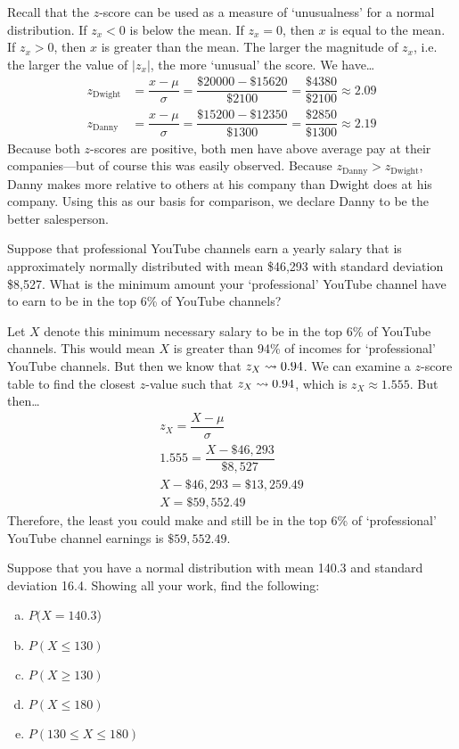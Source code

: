 \documentclass[12pt,letterpaper]{exam}
\begin{document}
\begin{questions}
\sol Recall that the $z$-score can be used as a measure of `unusualness' for a normal distribution. If $z_x < 0$ is below the mean. If $z_x = 0$, then $x$ is equal to the mean. If $z_x > 0$, then $x$ is greater than the mean. The larger the magnitude of $z_x$, i.e. the larger the value of $|z_x|$, the more `unusual' the score. We have\dots
	\[
	\begin{aligned}
	z_{\text{Dwight}}&= \dfrac{x - \mu}{\sigma}= \dfrac{\$20000 - \$15620}{\$2100}= \dfrac{\$4380}{\$2100} \approx 2.09 \\[0.3cm]
	z_{\text{Danny}}&= \dfrac{x - \mu}{\sigma}= \dfrac{\$15200 - \$12350}{\$1300}= \dfrac{\$2850}{\$1300} \approx 2.19
	\end{aligned}
	\]
Because both $z$-scores are positive, both men have above average pay at their companies---but of course this was easily observed. Because $z_{\text{Danny}} > z_{\text{Dwight}}$, Danny makes more relative to others at his company than Dwight does at his company. Using this as our basis for comparison, we declare Danny to be the better salesperson. 



\newpage
\question[10] Suppose that professional YouTube channels earn a yearly salary that is approximately normally distributed with mean \$46,293 with standard deviation \$8,527. What is the minimum amount your `professional' YouTube channel have to earn to be in the top 6\% of YouTube channels? \pspace

\sol Let $X$ denote this minimum necessary salary to be in the top 6\% of YouTube channels. This would mean $X$ is greater than 94\% of incomes for `professional' YouTube channels. But then we know that $z_X \rightsquigarrow 0.94$. We can examine a $z$-score table to find the closest $z$-value such that $z_X \rightsquigarrow 0.94$, which is $z_X \approx 1.555$. But then\dots
	\[
	\begin{gathered}
	z_X= \dfrac{X - \mu}{\sigma} \\[0.3cm]
	1.555= \dfrac{X - \$46,\!293}{\$8,\!527} \\[0.3cm]
	X - \$46,\!293= \$13,\!259.49 \\[0.3cm]
	X= \$59,\!552.49
	\end{gathered}
	\]
Therefore, the least you could make and still be in the top 6\% of `professional' YouTube channel earnings is $\$59,\!552.49$. 



\newpage
\question[10] Suppose that you have a normal distribution with mean 140.3 and standard deviation 16.4. Showing all your work, find the following:
	\begin{enumerate}[(a)]
	\item $P(X= 140.3$)
	\item $P(X \leq 130)$
	\item $P(X \geq 130)$
	\item $P(X \leq 180)$
	\item $P(130 \leq X \leq 180)$
	\end{enumerate} \pspace


\end{questions}
\end{document}
